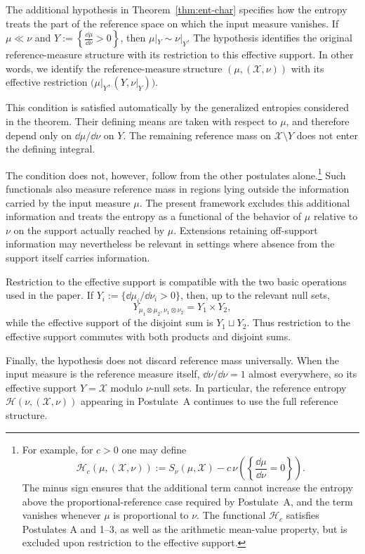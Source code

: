 \documentclass[reqno]{amsart}
\begin{document}
\begin{remark}
The additional hypothesis in Theorem~\ref{thm:ent-char} specifies how
the entropy treats the part of the reference space on which the input
measure vanishes. If $\mu\ll\nu$ and $Y := \left\{ \frac{\dd\mu}{\dd\nu}>0 \right\}$,
then $\mu|_Y\sim\nu|_Y$. The hypothesis identifies the original reference-measure structure with its restriction to this effective support. In other words,  we identify the reference-measure structure $(\mu,(\mathcal X,\nu))$ with its effective restriction
$\bigl(\mu|_Y,(Y,\nu|_Y) \bigr)$.

This condition is satisfied automatically by the generalized
entropies considered in the theorem. Their defining means are taken
with respect to $\mu$, and therefore depend only on
$\dd\mu/\dd\nu$ on $Y$. The remaining reference mass on
$\mathcal X\setminus Y$ does not enter the defining integral.

The condition does not, however, follow from the other postulates
alone.\footnote{For example, for $c>0$ one may define
$$
\mathcal H_c(\mu,(\mathcal X,\nu))
:=
S_\nu(\mu,\mathcal X)
-
c\,\nu\left(
\left\{
\frac{\dd\mu}{\dd\nu}=0
\right\}
\right).
$$
The minus sign ensures that the additional term cannot increase the
entropy above the proportional-reference case required by
Postulate~A, and the term vanishes whenever $\mu$ is proportional to
$\nu$. The functional $\mathcal H_c$ satisfies Postulates A and 1--3, as well as the arithmetic mean-value property, but  is excluded upon restriction to the effective support.}
Such functionals also measure reference mass in regions lying outside
the information carried by the input measure $\mu$. The present
framework excludes this additional information and treats the entropy
as a functional of the behavior of $\mu$ relative to $\nu$ on the
support actually reached by $\mu$. Extensions retaining off-support
information may nevertheless be relevant in settings where absence
from the support itself carries information.

Restriction to the effective support is compatible with the two basic
operations used in the paper. If
$Y_i:=\{\dd\mu_i/\dd\nu_i>0\}$, then, up to the relevant null sets,
$$
Y_{\mu_1\otimes\mu_2,\nu_1\otimes\nu_2}
=
Y_1\times Y_2,
$$
while the effective support of the disjoint sum is
$Y_1\sqcup Y_2$. Thus restriction to the effective support commutes
with both products and disjoint sums.

Finally, the hypothesis does not discard reference mass universally.
When the input measure is the reference measure itself,
$\dd\nu/\dd\nu=1$ almost everywhere, so its effective support $Y=\mathcal X$  modulo $\nu$-null sets. In particular, the reference
entropy $\mathcal H(\nu,(\mathcal X,\nu))$ appearing in Postulate~A
continues to use the full reference structure.
\end{remark}
\end{document}
